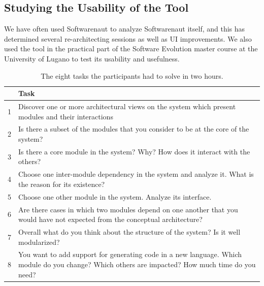 \documentclass[preprint,12pt]{elsarticle}
\begin{document}



\subsection {Studying the Usability of the Tool}
\label{sec:usability}
We have often used Softwarenaut to analyze Softwarenaut itself, and this has determined several re-architecting sessions as well as UI improvements. We also used the tool in the practical part of the Software Evolution master course at the University of Lugano to test its usability and usefulness. 

\begin{table}[b!]
\begin{center}
\begin{tabular}{l p{\linewidth}}
& \footnotesize{Task} \\ \hline
\footnotesize{1} & \footnotesize{Discover one or more architectural views on the system which present modules and their interactions} \\
\footnotesize{2} & \footnotesize {Is there a subset of the modules that you consider to be at the core of the system?} \\
\footnotesize{3} & \footnotesize {Is there a core module in the system? Why? How does it interact with the others?} \\
\footnotesize{4} & \footnotesize {Choose one inter-module dependency in the system and analyze it. What is the reason for its existence?} \\
\footnotesize{5} & \footnotesize {Choose one other module in the system. Analyze its interface.} \\
\footnotesize{6} & \footnotesize {Are there cases in which two modules depend on one another that you would have not expected from the conceptual architecture?} \\
\footnotesize{7} & \footnotesize {Overall what do you think about the structure of the system? Is it well modularized?} \\
\footnotesize{8} & \footnotesize {You want to add support for generating code in a new language. Which module do you change? Which others are impacted? How much time do you need?} \\ \hline
\end{tabular}
\caption{The eight tasks the participants had to solve in two hours.}
\label{tab:questions}
\end{center}
\end{table}
\end{document}
